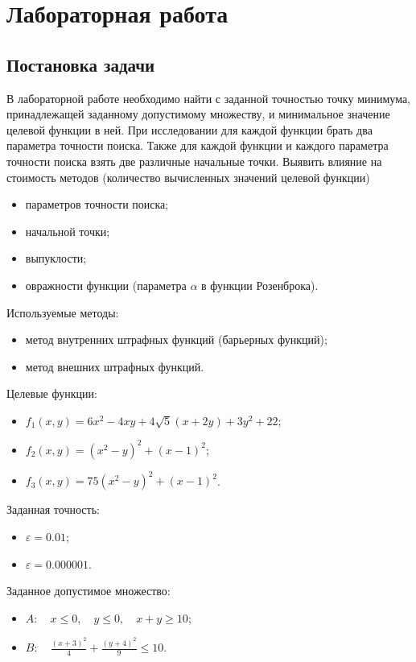 \documentclass[12pt, a4paper]{article}
\begin{document}
\newpage
\section{Лабораторная работа }


\subsection {Постановка задачи}
В лабораторной работе необходимо найти с заданной точностью точку минимума, принадлежащей заданному допустимому множеству, и минимальное значение целевой функции в ней. При исследовании для каждой функции брать два параметра точности поиска. Также для каждой функции и каждого параметра точности поиска взять две различные начальные точки. Выявить влияние на стоимость методов (количество вычисленных значений целевой функции)
\begin{itemize}
	\item параметров точности поиска;
	\item начальной точки;
	\item выпуклости;
	\item овражности функции (параметра $\alpha$ в функции Розенброка).
\end{itemize}
Используемые методы:
\begin{itemize}
	\item метод внутренних штрафных функций (барьерных функций);
	\item метод внешних штрафных функций.
\end{itemize}
Целевые функции:
\begin{itemize}
	\item $f_1(x,y)=6 x^2-4 x y+4 \sqrt{5} (x+2 y)+3 y^2+22$;
	\item  $f_2(x,y)=\left(x^2-y\right)^2+(x-1)^2$;
	\item  $f_3(x,y)=75\left(x^2-y\right)^2+(x-1)^2$.
\end{itemize}
Заданная точность: 
\begin{itemize}
	\item $\varepsilon=0.01$;
	\item $\varepsilon=0.000001$.
\end{itemize}
Заданное допустимое множество: 
\begin{itemize}
	\item $A: \quad x\leq0,\quad y\leq0,\quad x+y\ge 10$;
	\item $B: \quad \frac{(x+3)^2}{4}+\frac{(y+4)^2}{9} \leq10$.
\end{itemize}
\newpage
\end{document}
